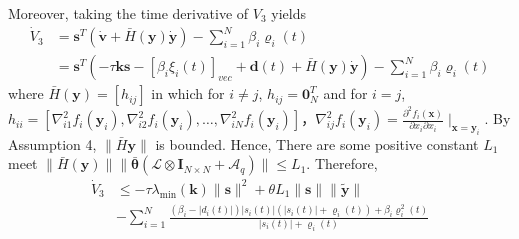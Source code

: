 \documentclass[lettersize,journal]{IEEEtran}
\begin{document}
Moreover, taking the time derivative of $V_3$ yields
\begin{equation}
    \begin{aligned}
        \dot{V}_3 & ={\mathbf{s}}^T(\dot{\mathbf{v}}+\bar{H}(\mathbf{y})\dot{\mathbf{y}}) - \sum_{i = 1}^{N} \beta_i\varrho_i(t)                                                 \\
                  & ={\mathbf{s}}^T(-\tau\mathbf{k}\mathbf{s}-[\beta_i\xi_i(t)]_{vec}+\mathbf{d}(t) +\bar{H}(\mathbf{y})\dot{\mathbf{y}}) - \sum_{i = 1}^{N} \beta_i\varrho_i(t)
    \end{aligned}
\end{equation}
where $\bar{H}(\mathbf{y})=[h_{ij}]$ in which for $i \neq j$, $h_{ij} = \mathbf{0}_N^T$ and for $i = j$, $h_{ii}=[\nabla_{i1}^{2}f_{i}(\mathbf{y}_{i}),\nabla_{i2}^{2}f_{i}(\mathbf{y}_{i}),\ldots,\nabla_{iN}^{2}f_{i}(\mathbf{y}_{i})]$，$\nabla_{ij}^{2}f_{i}(\mathbf{y}_{i})=\frac{\partial^{2}f_{i}(\mathbf{x})}{\partial x_{i}\partial x_{i}}\mid_{\mathbf{x}=\mathbf{y}_{i}}$. By Assumption 4, $\|\bar{H}\mathbf{y}\|$ is bounded. Hence, There are some positive constant $L_1$ meet $\|\bar{H}(\mathbf{y})\|\|\bar{\boldsymbol{\theta}}(\mathcal{L}\otimes \mathbf{I}_{N\times N}+\mathcal{A}_{q})\|\leq L_{1}$. Therefore,
\begin{equation}
    \begin{aligned}
        \dot{V}_3 & \leq-\tau\lambda_{\min}(\mathbf{k})\|{\mathbf{s}}\|^2+\theta L_1\|{\mathbf{s}}\|\|\tilde{\mathbf{y}}\|                       \\
                  & -\sum_{i = 1}^{N}\frac{(\beta_i - |d_i(t)|)|s_i(t)|(|s_i(t)|+\varrho_i(t)) + \beta_i\varrho_i^2(t)}{|s_i(t)| + \varrho_i(t)}
    \end{aligned}
\end{equation}
\end{document}
